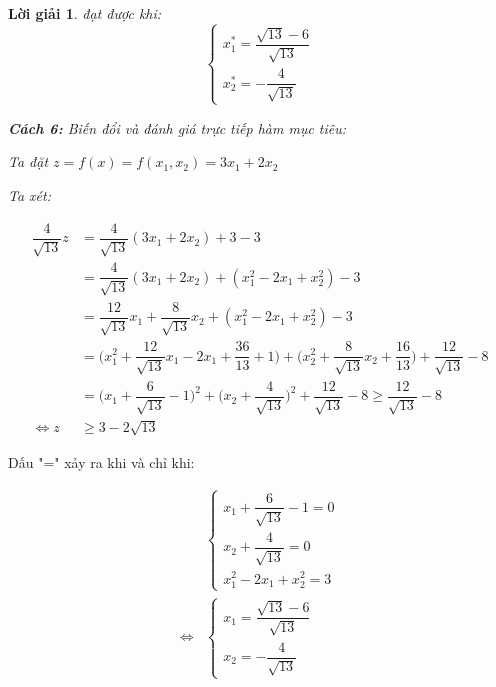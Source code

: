 \documentclass[14pt, a4paper]{article}
\theoremstyle{sltheorem}
\theoremstyle{soltheorem}
\newtheorem*{loigiai}{Lời giải}
\begin{document}
\begin{loigiai}
        đạt được khi:
        \begin{equation*}
            \begin{cases} 
                x_1^* = \dfrac{\sqrt{13} - 6}{\sqrt{13}} \\ 
                x_2^* = - \dfrac{4}{\sqrt{13}} 
            \end{cases}
        \end{equation*}

        \textbf{Cách 6:} Biến đổi và đánh giá trực tiếp hàm mục tiêu:

        Ta đặt $z = f(x) = f(x_1, x_2) = 3 x_1 + 2 x_2$

        Ta xét:

        \begin{equation*}
            \begin{aligned}
            \dfrac{4}{\sqrt{13}} z &= \dfrac{4}{\sqrt{13}} (3 x_1 + 2 x_2 ) + 3 - 3 \\
                                & = \dfrac{4}{\sqrt{13}} (3 x_1 + 2 x_2 ) + (x_1^2 - 2x_1 + x_2^2) - 3 \\
                                & = \dfrac{12}{\sqrt{13}} x_1 + \dfrac{8}{\sqrt{13}} x_2 + (x_1^2 - 2x_1 + x_2^2) - 3 \\
                                & = \Big ( x_1^2 + \dfrac{12}{\sqrt{13}} x_1 - 2 x_1 + \dfrac{36}{13} + 1 \Big) + \Big ( x_2^2 + \dfrac{8}{\sqrt{13}}x_2 + \dfrac{16}{13} \Big) + \dfrac{12}{\sqrt{13}} - 8 \\
                                & = \Big ( x_1 + \dfrac{6}{\sqrt{13}} - 1 \Big)^2 + \Big( x_2 + \dfrac{4}{\sqrt{13}} \Big)^2 + \dfrac{12}{\sqrt{13}} - 8 \geq \dfrac{12}{\sqrt{13}} - 8 \\
                        \Leftrightarrow z &\geq 3 - 2\sqrt{13}
            \end{aligned}
        \end{equation*}
    \end{loigiai}

    Dấu "=" xảy ra khi và chỉ khi:

    \begin{equation*}
        \begin{aligned}
        &\begin{cases}
            x_1 + \dfrac{6}{\sqrt{13}} - 1 = 0 \\ 
            x_2 + \dfrac{4}{\sqrt{13}} = 0 \\
            x_1^2 - 2x_1 + x_2^2 = 3
        \end{cases} \\
        \Leftrightarrow & \begin{cases}
            x_1 = \dfrac{\sqrt{13} - 6}{\sqrt{13}} \\ 
            x_2 = - \dfrac{4}{\sqrt{13}} 
        \end{cases}
        \end{aligned}
    \end{equation*}
\end{document}
